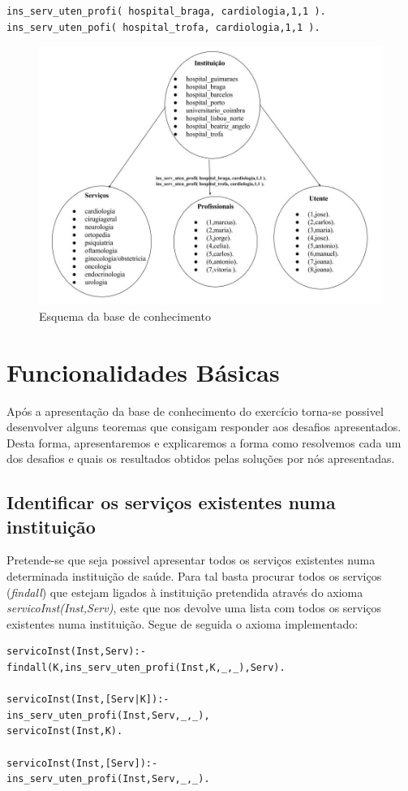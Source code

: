 \begin{verbatim}
ins_serv_uten_profi( hospital_braga, cardiologia,1,1 ).
ins_serv_uten_pofi( hospital_trofa, cardiologia,1,1 ).
\end{verbatim}

\begin{figure}[<+htpb+>]
	\centering
	\includegraphics[scale=0.3]{esquema.jpg}
	\caption{Esquema da base de conhecimento }
	\label{p3:fig:esquema1}
\end{figure}
\newpage


\section{Funcionalidades Básicas}
\label{p3:funcbasic}

Após a apresentação da base de conhecimento do exercício torna-se possivel desenvolver alguns teoremas que consigam responder aos desafios apresentados. Desta forma, apresentaremos e explicaremos a forma como resolvemos cada um dos desafios e quais os resultados obtidos pelas soluções por nós apresentadas. 

\subsection{Identificar os serviços existentes numa instituição}
Pretende-se que seja possivel apresentar todos os serviços existentes numa determinada instituição de saúde. Para tal basta procurar todos os serviços (\textit{findall}) que estejam ligados à instituição pretendida através do axioma \textit{servicoInst(Inst,Serv)}, este que nos devolve uma lista com todos os serviços existentes numa instituição.  
Segue de seguida o axioma implementado: 
\begin{verbatim}
servicoInst(Inst,Serv):-
findall(K,ins_serv_uten_profi(Inst,K,_,_),Serv).      

servicoInst(Inst,[Serv|K]):- 
ins_serv_uten_profi(Inst,Serv,_,_),
servicoInst(Inst,K).

servicoInst(Inst,[Serv]):- 
ins_serv_uten_profi(Inst,Serv,_,_).
\end{verbatim}

